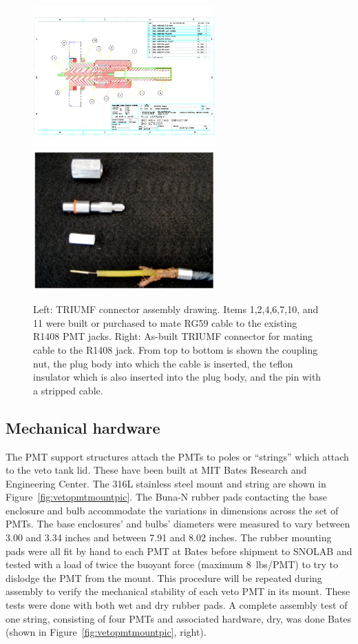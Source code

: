 \documentclass[review,number,sort&compress]{elsarticle}
\begin{document}
\begin{figure}[ht]
\begin{center}
\includegraphics[width=2.75in]{graphics/snoConnectorDrawings.pdf}
\includegraphics[width=2.75in]{graphics/connectorpic.pdf}
\caption{Left: TRIUMF connector assembly drawing. Items 1,2,4,6,7,10, and 11 were built or purchased to mate RG59 cable to the existing R1408 PMT jacks. Right: As-built TRIUMF connector for mating cable to the R1408 jack. From top to bottom is shown the coupling nut, the plug body into which the cable is inserted, the teflon insulator which is also inserted into the plug body, and the pin with a stripped cable.
\label{fig:connectordrawing}}
\end{center}
\end{figure}


\subsection{Mechanical hardware}
%
The PMT support structures attach the PMTs to poles or
``strings'' which attach to the veto tank lid. These have been built at
MIT Bates Research and Engineering Center. 
The 316L stainless steel mount and string are shown in
Figure~\ref{fig:vetopmtmountpic}. The
Buna-N rubber pads contacting the base enclosure and bulb accommodate
the variations in dimensions across the set of PMTs. The base
enclosures' and bulbs' diameters were measured to vary between 3.00
and 3.34 inches and between 7.91 and 8.02 inches. The rubber mounting
pads were all fit by hand to each PMT at Bates before shipment to
SNOLAB and tested with a load of twice the buoyant force (maximum
8~lbs/PMT) to try to dislodge the PMT from the mount. This procedure
will be repeated during assembly to verify the mechanical stability of
each veto PMT in its mount. These tests were done with both wet and dry
rubber pads. A complete assembly test of one string, consisting of
four PMTs and associated hardware, dry, was done Bates (shown in Figure~\ref{fig:vetopmtmountpic}, right).
\end{document}
